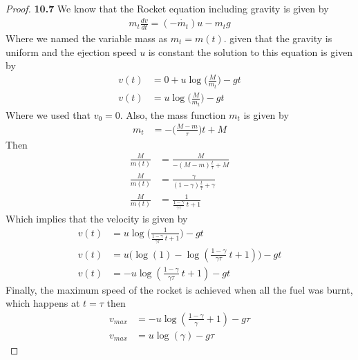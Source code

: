 \documentclass[11pt]{article}
\theoremstyle{definition}
\begin{document}
\cleardoublepage
	\begin{proof}{\textbf{10.7}}
        We know that the Rocket equation including gravity is given by
        \begin{align*}
            m_t\frac{dv}{dt} = (-\dot{m_t})u - m_tg
        \end{align*}
        Where we named the variable mass as $m_t = m(t)$.
        given that the gravity is uniform and the ejection speed $u$ is
        constant the solution to this equation is given by
        \begin{align*}
            v(t) &= 0 + u\log\bigg(\frac{M}{m_t}\bigg) - gt\\
            v(t) &= u\log\bigg(\frac{M}{m_t}\bigg) - gt
        \end{align*}
        Where we used that $v_0 = 0$. Also, the mass function $m_t$ is given
        by
        \begin{align*}
            m_t &= -\bigg(\frac{M-m}{\tau}\bigg)t + M
        \end{align*}
        Then
        \begin{align*}
            \frac{M}{m(t)} &= \frac{M}{-(M-m)\frac{t}{\tau} + M}\\
            \frac{M}{m(t)} &= \frac{\gamma}{(1 - \gamma)\frac{t}{\tau} + \gamma}\\
            \frac{M}{m(t)} &= \frac{1}{\frac{1 - \gamma}{\gamma\tau}~t + 1}
        \end{align*}
        Which implies that the velocity is given by
        \begin{align*}
            v(t) &= u\log\bigg(\frac{1}{\frac{1 - \gamma}{\gamma\tau}~t + 1}\bigg)
            - gt\\
            v(t) &= u\bigg(\log(1) -\log(\frac{1 - \gamma}{\gamma\tau}~t + 1)\bigg)
            - gt\\
            v(t) &= -u\log(\frac{1 - \gamma}{\gamma\tau}~t + 1) - gt
        \end{align*}
        Finally, the maximum speed of the rocket is achieved when all the fuel
        was burnt, which happens at $t=\tau$ then
        \begin{align*}
            v_{max} &= -u\log(\frac{1-\gamma}{\gamma} +1) - g\tau\\
            v_{max} &= u\log(\gamma) - g\tau
        \end{align*}


\end{proof}
\end{document}
